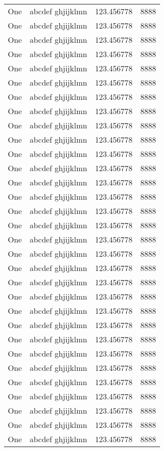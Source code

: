 \begin{center}
\begin{longtable}{| c | L{4cm} | L{6cm} | L{4cm} |}
One & abcdef ghjijklmn & 123.456778 & 8888 \\
One & abcdef ghjijklmn & 123.456778 & 8888 \\
One & abcdef ghjijklmn & 123.456778 & 8888 \\
One & abcdef ghjijklmn & 123.456778 & 8888 \\
One & abcdef ghjijklmn & 123.456778 & 8888 \\
One & abcdef ghjijklmn & 123.456778 & 8888 \\
One & abcdef ghjijklmn & 123.456778 & 8888 \\
One & abcdef ghjijklmn & 123.456778 & 8888 \\
One & abcdef ghjijklmn & 123.456778 & 8888 \\
One & abcdef ghjijklmn & 123.456778 & 8888 \\
One & abcdef ghjijklmn & 123.456778 & 8888 \\
One & abcdef ghjijklmn & 123.456778 & 8888 \\
One & abcdef ghjijklmn & 123.456778 & 8888 \\
One & abcdef ghjijklmn & 123.456778 & 8888 \\
One & abcdef ghjijklmn & 123.456778 & 8888 \\
One & abcdef ghjijklmn & 123.456778 & 8888 \\
One & abcdef ghjijklmn & 123.456778 & 8888 \\
One & abcdef ghjijklmn & 123.456778 & 8888 \\
One & abcdef ghjijklmn & 123.456778 & 8888 \\
One & abcdef ghjijklmn & 123.456778 & 8888 \\
One & abcdef ghjijklmn & 123.456778 & 8888 \\
One & abcdef ghjijklmn & 123.456778 & 8888 \\
One & abcdef ghjijklmn & 123.456778 & 8888 \\
One & abcdef ghjijklmn & 123.456778 & 8888 \\
One & abcdef ghjijklmn & 123.456778 & 8888 \\
One & abcdef ghjijklmn & 123.456778 & 8888 \\
One & abcdef ghjijklmn & 123.456778 & 8888 \\
One & abcdef ghjijklmn & 123.456778 & 8888 \\
One & abcdef ghjijklmn & 123.456778 & 8888 \\
One & abcdef ghjijklmn & 123.456778 & 8888 \\
One & abcdef ghjijklmn & 123.456778 & 8888 \\
\end{longtable}
\end{center}
\restoregeometry
